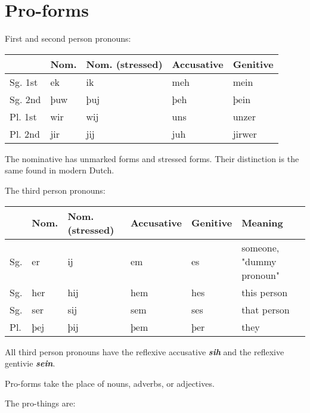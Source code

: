 \section{Pro-forms}

First and second person pronouns:

\begin{center}
\begin{tabular}{lllll}
& Nom. & Nom. (stressed) & Accusative & Genitive \\
\hline
Sg. 1st & ek  & ik  & meh & mein  \\
Sg. 2nd & þuw & þuj & þeh & þein \\
Pl. 1st & wir & wij & uns & unzer \\
Pl. 2nd & jir & jij & juh & jirwer \\
\end{tabular}
\end{center}

The nominative has unmarked forms and stressed forms. Their distinction is the same found in modern Dutch.

The third person pronouns:

\begin{center}
\begin{tabular}{llllll}
& Nom. & Nom. (stressed) & Accusative & Genitive & Meaning \\
\hline
Sg. & er  & ij  & em  & es  & someone, "dummy pronoun" \\
Sg. & her & hij & hem & hes & this person \\
Sg. & ser & sij & sem & ses & that person \\
Pl. & þej & þij & þem & þer & they \\ 
\end{tabular}
\end{center}

All third person pronouns have the reflexive accusative \textbf{\textit{sih}} and the reflexive gentivie \textbf{\textit{sein}}.

Pro-forms take the place of nouns, adverbs, or adjectives.

The pro-things are:

